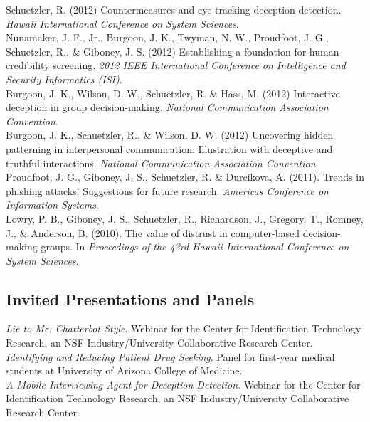 \documentclass[10pt, a4paper]{article}
\newcommand{\years}[1]{\marginnote{\scriptsize #1}}
\begin{document}
\years{2012}Schuetzler, R. (2012) Countermeasures and eye tracking deception
detection. \emph{Hawaii International Conference on System Sciences}.\\

Nunamaker, J. F., Jr., Burgoon, J. K., Twyman, N. W., Proudfoot, J. G.,
Schuetzler, R., \& Giboney, J. S. (2012) Establishing a foundation for human
credibility screening. \emph{2012 IEEE International Conference on Intelligence
  and Security Informatics (ISI)}.\\

Burgoon, J. K., Wilson, D. W., Schuetzler, R. \& Hass, M. (2012) Interactive
deception in group decision-making. \emph{National Communication Association
  Convention}.\\
\newpage
Burgoon, J. K., Schuetzler, R., \& Wilson, D. W. (2012) Uncovering hidden
patterning in interpersonal communication: Illustration with deceptive and
truthful interactions. \emph{National Communication Association Convention}.\\

\years{2011}Proudfoot, J. G., Giboney, J. S., Schuetzler, R. \& Durcikova,
A. (2011). Trends in phishing attacks: Suggestions for future
research. \emph{Americas Conference on Information Systems}.\\

\years{2010}Lowry, P. B., Giboney, J. S., Schuetzler, R., Richardson, J.,
Gregory, T., Romney, J., \& Anderson, B. (2010). The value of distrust in
computer-based decision-making groups. In \emph{Proceedings of the 43rd Hawaii
  International Conference on System Sciences}.

\subsection*{Invited Presentations and Panels}
\noindent

\years{2015}\emph{Lie to Me: Chatterbot Style}. Webinar for the Center for Identification
Technology Research, an NSF Industry/University Collaborative Research Center.\\

\years{2014}\emph{Identifying and Reducing Patient Drug Seeking}. Panel for first-year
medical students at University of Arizona College of Medicine.\\

\emph{A Mobile Interviewing Agent for Deception Detection}. Webinar for the
Center for Identification Technology Research, an NSF Industry/University Collaborative
Research Center.\\
\end{document}
